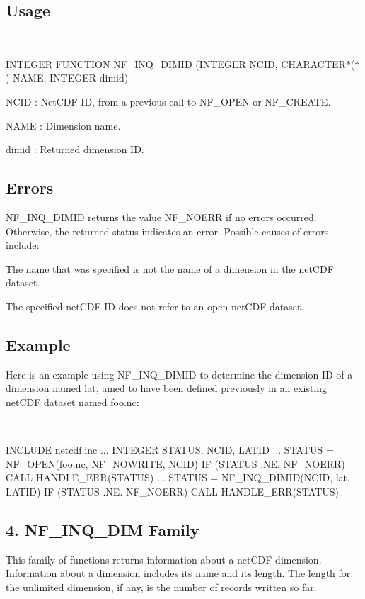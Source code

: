 \subsection*{Usage }

 

I\+N\+T\+E\+G\+ER F\+U\+N\+C\+T\+I\+ON N\+F\+\_\+\+I\+N\+Q\+\_\+\+D\+I\+M\+ID (I\+N\+T\+E\+G\+ER N\+C\+ID, C\+H\+A\+R\+A\+C\+T\+E\+R$\ast$($\ast$) N\+A\+ME, I\+N\+T\+E\+G\+ER dimid)

{\ttfamily N\+C\+ID} \+: Net\+C\+DF ID, from a previous call to N\+F\+\_\+\+O\+P\+EN or N\+F\+\_\+\+C\+R\+E\+A\+TE.

{\ttfamily N\+A\+ME} \+: Dimension name.

{\ttfamily dimid} \+: Returned dimension ID.

\subsection*{Errors }

N\+F\+\_\+\+I\+N\+Q\+\_\+\+D\+I\+M\+ID returns the value N\+F\+\_\+\+N\+O\+E\+RR if no errors occurred. Otherwise, the returned status indicates an error. Possible causes of errors include\+:


\begin{DoxyItemize}
\item The name that was specified is not the name of a dimension in the net\+C\+DF dataset.
\item The specified net\+C\+DF ID does not refer to an open net\+C\+DF dataset.
\end{DoxyItemize}

\subsection*{Example }

Here is an example using N\+F\+\_\+\+I\+N\+Q\+\_\+\+D\+I\+M\+ID to determine the dimension ID of a dimension named lat, amed to have been defined previously in an existing net\+C\+DF dataset named foo.\+nc\+:

 

I\+N\+C\+L\+U\+DE \textquotesingle{}netcdf.\+inc\textquotesingle{} ... I\+N\+T\+E\+G\+ER S\+T\+A\+T\+US, N\+C\+ID, L\+A\+T\+ID ... S\+T\+A\+T\+US = N\+F\+\_\+\+O\+P\+EN(\textquotesingle{}foo.\+nc\textquotesingle{}, N\+F\+\_\+\+N\+O\+W\+R\+I\+TE, N\+C\+ID) IF (S\+T\+A\+T\+US .NE. N\+F\+\_\+\+N\+O\+E\+RR) C\+A\+LL H\+A\+N\+D\+L\+E\+\_\+\+E\+R\+R(\+S\+T\+A\+T\+U\+S) ... S\+T\+A\+T\+US = N\+F\+\_\+\+I\+N\+Q\+\_\+\+D\+I\+M\+ID(N\+C\+ID, \textquotesingle{}lat\textquotesingle{}, L\+A\+T\+ID) IF (S\+T\+A\+T\+US .NE. N\+F\+\_\+\+N\+O\+E\+RR) C\+A\+LL H\+A\+N\+D\+L\+E\+\_\+\+E\+R\+R(\+S\+T\+A\+T\+U\+S)\hypertarget{nc_f77_interface_guide_f77_NF-INQ-DIM-Family}{}\subsection{4. N\+F\+\_\+\+I\+N\+Q\+\_\+\+D\+I\+M Family }\label{nc_f77_interface_guide_f77_NF-INQ-DIM-Family}
This family of functions returns information about a net\+C\+DF dimension. Information about a dimension includes its name and its length. The length for the unlimited dimension, if any, is the number of records written so far.

